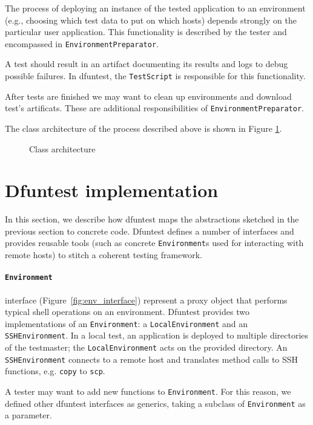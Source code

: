 The process of deploying an instance of the tested application to an
environment (e.g., choosing which test data to put on which hosts)
depends strongly on the particular user application. This functionality is
described by the tester and encompassed in \texttt{EnvironmentPreparator}.

A test should result in an artifact documenting its results and logs to debug
possible failures. In dfuntest, the \texttt{TestScript} is responsible for this
functionality.

After tests are finished we may want to clean up environments and download test's artificats.
These are additional responsibilities of \texttt{EnvironmentPreparator}.

The class architecture of the process described above is shown in Figure
\ref{fig:4_class_architecture}.

\begin{figure}[tbp]
  \centering
  \def\svgwidth{\columnwidth}
  \scriptsize {
  
}
\caption{Class architecture}
\label{fig:4_class_architecture}
\end{figure}

\section{Dfuntest implementation}\label{sec:dfunt-impl}

In this section, we describe how dfuntest maps the abstractions sketched in the previous section to concrete code. Dfuntest defines a number of interfaces and provides reusable tools (such as concrete \texttt{Environment}s used for interacting with remote hosts) to stitch a coherent testing framework.

\paragraph{\texttt{Environment}} interface (Figure~\ref{fig:env_interface}) represent a proxy
object that performs typical shell operations on an environment.
Dfuntest provides two implementations of an \texttt{Environment}:
a \texttt{LocalEnvironment} and an \texttt{SSHEnvironment}.
In a local test, an application is deployed to multiple directories of the testmaster; the \texttt{LocalEnvironment} acts on the provided directory.
An \texttt{SSHEnvironment} connects to a remote host and translates method calls to SSH functions, e.g. \texttt{copy} to \texttt{scp}.

A tester may want to add new functions to \texttt{Environment}. For this reason, we defined other dfuntest interfaces as generics, taking a subclass of \texttt{Environment} as a parameter. 

